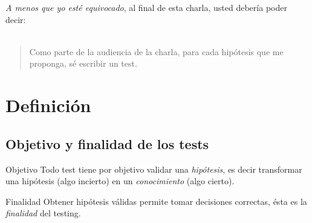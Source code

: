 
%

\begin{frame}[t,plain]
  \maketitle
\end{frame}

\begin{frame}
  \emph{A menos que yo esté equivocado}, al final de esta charla, usted debería poder decir:\\~\\
  \hspace{.9em}\vspace{-1.4em}
  \begin{quote}
    Como parte de la audiencia de la charla, para cada hipótesis que me proponga, sé escribir un test.
    \hspace{.5em}
  \end{quote}
\end{frame}

\section{Definición}

  \begin{frame}
    \tableofcontents[currentsection]
  \end{frame}

%
\subsection{Objetivo y finalidad de los tests}

  \begin{frame}{\insertsubsection}
    \begin{alertblock}{Objetivo}
      Todo test tiene por objetivo \alert{validar} una \emph{hipótesis}, es decir transformar una hipótesis (algo incierto) en un \emph{conocimiento} (algo cierto).
    \end{alertblock}
    \begin{block}{Finalidad}
      Obtener hipótesis válidas permite \alert{tomar decisiones correctas}, ésta es la \emph{finalidad} del testing.
    \end{block}
  \end{frame}


